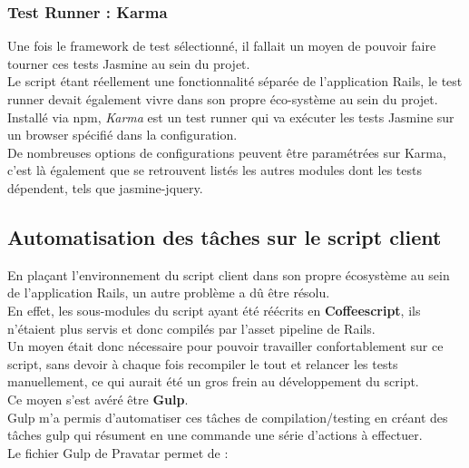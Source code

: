 \documentclass{report}
\begin{document}
        \subsubsection{Test Runner : Karma}
        \label{subs:Test Runner : Karma}

          Une fois le framework de test sélectionné, il fallait un moyen de pouvoir faire tourner ces tests Jasmine au sein du projet.\\

          Le script étant réellement une fonctionnalité séparée de l'application Rails, le test runner devait également vivre dans son propre éco-système au sein du projet.\\

          Installé via npm, \textit{Karma} est un test runner qui va exécuter les tests Jasmine sur un browser spécifié dans la configuration.\\
          De nombreuses options de configurations peuvent être paramétrées sur Karma, c'est là également que se retrouvent listés les autres modules dont les tests dépendent, tels que jasmine-jquery.\\

      \subsection{Automatisation des tâches sur le script client}
      \label{subs:Automatisation des tâches sur le script client}

        En plaçant l'environnement du script client dans son propre écosystème au sein de l'application Rails, un autre problème a dû être résolu.\\

        En effet, les sous-modules du script ayant été réécrits en \textbf{Coffeescript}, ils n'étaient plus servis et donc compilés par l'asset pipeline de Rails.\\
        Un moyen était donc nécessaire pour pouvoir travailler confortablement sur ce script, sans devoir à chaque fois recompiler le tout et relancer les tests manuellement,
        ce qui aurait été un gros frein au développement du script.\\

        Ce moyen s'est avéré être \textbf{Gulp}.\\
        Gulp m'a permis d'automatiser ces tâches de compilation/testing en créant des tâches gulp qui résument en une commande une série d'actions à effectuer.\\
        Le fichier Gulp de Pravatar permet de :\\
\end{document}
